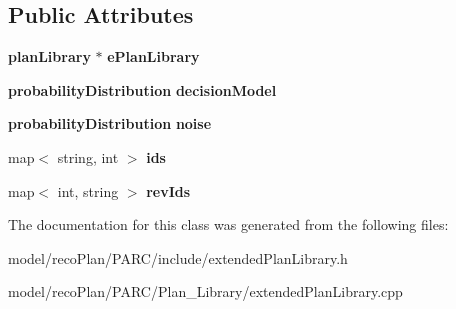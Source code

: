 \subsection*{Public Attributes}
\begin{DoxyCompactItemize}
\item 
\mbox{\label{classextended_plan_library_adfdeadb3a9690edfca909654225be623}} 
\textbf{ plan\+Library} $\ast$ {\bfseries e\+Plan\+Library}
\item 
\mbox{\label{classextended_plan_library_a1101073d7204ead7bc74adc82a60883b}} 
\textbf{ probability\+Distribution} {\bfseries decision\+Model}
\item 
\mbox{\label{classextended_plan_library_a912a4990ef0413b38d12db23216297b6}} 
\textbf{ probability\+Distribution} {\bfseries noise}
\item 
\mbox{\label{classextended_plan_library_a2bcd4077b34545e5dba7d988ec299eca}} 
map$<$ string, int $>$ {\bfseries ids}
\item 
\mbox{\label{classextended_plan_library_a57548009a05ac7723e2fab4df9212eee}} 
map$<$ int, string $>$ {\bfseries rev\+Ids}
\end{DoxyCompactItemize}


The documentation for this class was generated from the following files\+:\begin{DoxyCompactItemize}
\item 
model/reco\+Plan/\+P\+A\+R\+C/include/extended\+Plan\+Library.\+h\item 
model/reco\+Plan/\+P\+A\+R\+C/\+Plan\+\_\+\+Library/extended\+Plan\+Library.\+cpp\end{DoxyCompactItemize}
